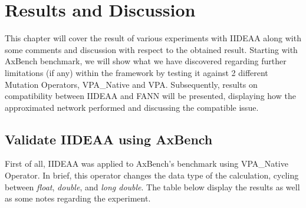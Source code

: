 \chapter{Results and Discussion}

This chapter will cover the result of various experiments with IIDEAA along with some comments and discussion with respect to the obtained result. Starting with AxBench benchmark, we will show what we have discovered regarding further limitations (if any) within the framework by testing it against 2 different Mutation Operators, VPA\_Native and VPA. Subsequently, results on compatibility between IIDEAA and FANN will be presented, displaying how the approximated network performed and discussing the compatible issue. \\

\section{Validate IIDEAA using AxBench}

First of all, IIDEAA was applied to AxBench's benchmark using VPA\_Native Operator. In brief, this operator changes the data type of the calculation, cycling between \textit{float}, \textit{double}, and \textit{long double}. The table below display the results as well as some notes regarding the experiment.\\
~\\
\newpage

